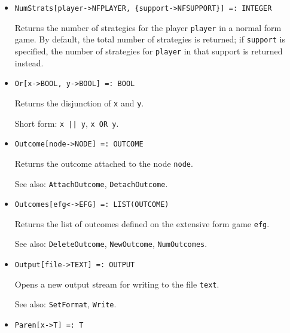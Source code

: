 \begin{itemize}
\item
\protect \large \begin{verbatim}
NumStrats[player->NFPLAYER, {support->NFSUPPORT}] =: INTEGER
\end{verbatim}\normalsize

\bd
Returns the number of strategies for the player \verb+player+
in a normal form game.  By default, the total number of strategies is
returned; if \verb+support+ is specified, the number of strategies
for \verb+player+ in that support is returned instead.
\ed


\item 
\protect \large \begin{verbatim}
Or[x->BOOL, y->BOOL] =: BOOL
\end{verbatim} \normalsize
  
\bd
Returns the disjunction of \verb+x+ and \verb+y+.
\item
[Short form:] \verb+x || y+, \verb+x OR y+.
\ed

\item
\protect \large \begin{verbatim}
Outcome[node->NODE] =: OUTCOME
\end{verbatim}\normalsize

\bd
Returns the outcome attached to the node \verb+node+.
\item
[See also:] {\tt AttachOutcome}, {\tt DetachOutcome}.
\ed

\item
\protect \large \begin{verbatim}
Outcomes[efg<->EFG] =: LIST(OUTCOME)
\end{verbatim}\normalsize

\bd
Returns the list of outcomes defined on the extensive form
game \verb+efg+.
\item
[See also:] {\tt DeleteOutcome}, {\tt NewOutcome}, {\tt NumOutcomes}.
\ed

\item
\protect \large \begin{verbatim}
Output[file->TEXT] =: OUTPUT
\end{verbatim}\normalsize

\bd
Opens a new output stream for writing to the file \verb+text+.
\item
[See also:] {\tt SetFormat}, {\tt Write}.
\ed


\item
\protect \large \begin{verbatim}
Paren[x->T] =: T
\end{verbatim}\normalsize


\end{itemize}
